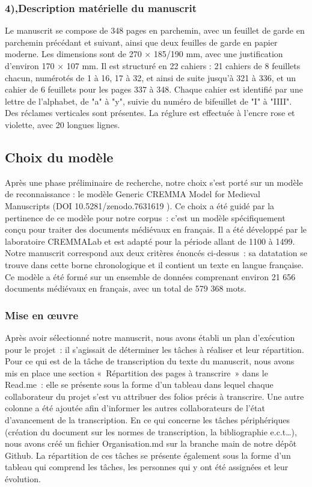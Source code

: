 \documentclass[12pt,a4paper,oneside]{article} %
\begin{document}
\subsubsection{4),Description matérielle du manuscrit}
Le manuscrit se compose de 348 pages en parchemin, avec un feuillet de garde en parchemin précédant et suivant, ainsi que deux feuilles de garde en papier moderne. Les dimensions sont de 270 × 185/190 mm, avec une justification d'environ 170 × 107 mm. Il est structuré en 22 cahiers : 21 cahiers de 8 feuillets chacun, numérotés de 1 à 16, 17 à 32, et ainsi de suite jusqu'à 321 à 336, et un cahier de 6 feuillets pour les pages 337 à 348. Chaque cahier est identifié par une lettre de l'alphabet, de "a" à "y", suivie du numéro de bifeuillet de "I" à "IIII". Des réclames verticales sont présentes. La réglure est effectuée à l'encre rose et violette, avec 20 longues lignes.
\subsection{Choix du modèle}
Après une phase préliminaire de recherche, notre choix s'est porté sur un modèle de reconnaissance : le modèle Generic CREMMA Model for Medieval Manuscripts (DOI 10.5281/zenodo.7631619 ). Ce choix a été guidé par la pertinence de ce modèle  pour notre corpus : c’est un modèle spécifiquement conçu pour traiter des documents médiévaux en français. Il a été développé par le laboratoire CREMMALab et est adapté pour la période allant de 1100 à 1499. Notre manuscrit correspond aux deux critères énoncés ci-dessus : sa datatation se trouve dans cette borne chronologique et il contient un texte en langue française. Ce modèle a été formé sur un ensemble de données comprenant environ 21 656 documents médiévaux en français, avec un total de 579 368 mots.
\subsubsection{Mise en œuvre}
Après avoir sélectionné notre manuscrit, nous avons établi un plan d'exécution pour le projet : il s’agissait de déterminer les tâches à réaliser et leur répartition. Pour ce qui est de la tâche de transcription du texte du manuscrit, nous avons mis en place une section « Répartition des pages à transcrire » dans le Read.me : elle se présente sous la forme d’un tableau dans lequel chaque collaborateur du projet s’est vu attribuer des folios précis à transcrire. Une autre colonne a été ajoutée afin d’informer les autres collaborateurs de l’état d’avancement de la transcription. En ce qui concerne les tâches périphériques (création du document sur les normes de transcription, la bibliographie e.c.t…),  nous avons créé un fichier Organisation.md sur la branche main de notre dépôt Github. La répartition de ces tâches se présente également sous la forme d’un tableau qui comprend les tâches, les personnes qui y ont été assignées et leur évolution.
\end{document}
